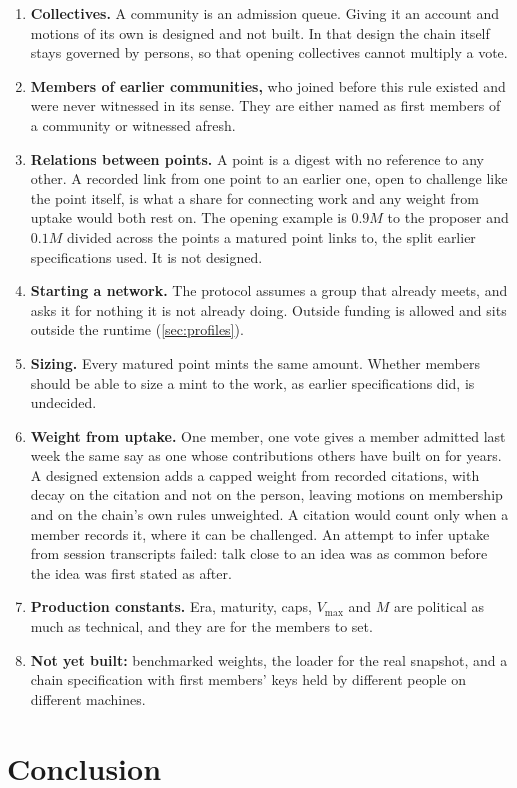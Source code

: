 \documentclass[11pt,a4paper]{article}
\theoremstyle{definition}
\theoremstyle{plain}
\theoremstyle{remark}
\begin{document}
\begin{enumerate}
  \item \textbf{Collectives.} A community is an admission queue. Giving it an account and motions of its own is designed and not built. In that design the chain itself stays governed by persons, so that opening collectives cannot multiply a vote.
  \item \textbf{Members of earlier communities,} who joined before this rule existed and were never witnessed in its sense. They are either named as first members of a community or witnessed afresh.
  \item \textbf{Relations between points.} A point is a digest with no reference to any other. A recorded link from one point to an earlier one, open to challenge like the point itself, is what a share for connecting work and any weight from uptake would both rest on. The opening example is $0.9M$ to the proposer and $0.1M$ divided across the points a matured point links to, the split earlier specifications used. It is not designed.
  \item \textbf{Starting a network.} The protocol assumes a group that already meets, and asks it for nothing it is not already doing. Outside funding is allowed and sits outside the runtime (\cref{sec:profiles}).
  \item \textbf{Sizing.} Every matured point mints the same amount. Whether members should be able to size a mint to the work, as earlier specifications did, is undecided.
  \item \textbf{Weight from uptake.} One member, one vote gives a member admitted last week the same say as one whose contributions others have built on for years. A designed extension adds a capped weight from recorded citations, with decay on the citation and not on the person, leaving motions on membership and on the chain's own rules unweighted. A citation would count only when a member records it, where it can be challenged. An attempt to infer uptake from session transcripts failed: talk close to an idea was as common before the idea was first stated as after.
  \item \textbf{Production constants.} Era, maturity, caps, $V_{\max}$ and $M$ are political as much as technical, and they are for the members to set.
  \item \textbf{Not yet built:} benchmarked weights, the loader for the real snapshot, and a chain specification with first members' keys held by different people on different machines.
\end{enumerate}

\section{Conclusion}
\label{sec:conclusion}
\end{document}

